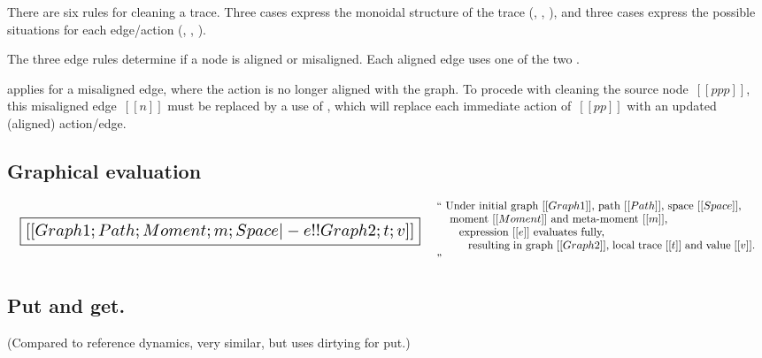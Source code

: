 \documentclass[11pt]{article}
\begin{document}
\begin{mathpar}
\end{mathpar}

There are six rules for cleaning a trace.
%
Three cases express the monoidal structure of the
trace (, , ), and
three cases express the possible situations for each edge/action
(, ,
).

The three edge rules determine if a node is aligned or misaligned.
%
Each aligned edge uses one of the
two .

 applies for a misaligned edge, where the action
is no longer aligned with the graph.
%
To procede with cleaning the source node~$[[ppp]]$, this misaligned edge~$[[n]]$ must be
replaced by a use of , which will replace each
immediate action of~$[[pp]]$ with an updated (aligned) action/edge.

\subsection{Graphical evaluation}

\[
\begin{array}{lc}
  {\scalebox{1.5}{
  \boxed{[[Graph1; Path; Moment; m; Space |- e !! Graph2; t; v]]}}}
&
\begin{array}{p{4in}}
  ``
  Under initial graph~$[[Graph1]]$,
  path~$[[Path]]$,
  space~$[[Space]]$,\\
  \hspace{3mm}~moment~$[[Moment]]$ and meta-moment~$[[m]]$,\\
  \hspace{6mm}~expression~$[[e]]$ evaluates fully,\\
  \hspace{9mm}~resulting in graph~$[[Graph2]]$, local trace~$[[t]]$ and value~$[[v]]$.
  ''
\end{array}
\end{array}
\]

\subsection{Put and get.}

(Compared to reference dynamics, very similar, but uses dirtying for put.)
\end{document}
